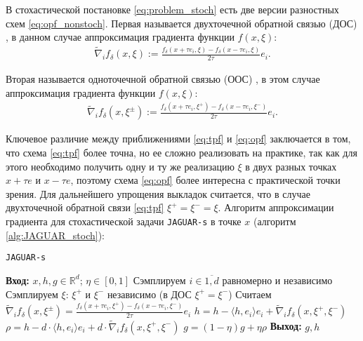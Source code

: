     В стохастической постановке \eqref{eq:problem_stoch} есть две версии разностных схем \eqref{eq:opf_nonstoch}. Первая называется двухточечной обратной связью (ДОС) \cite{duchi2015optimal, shamir2017optimal, doi:10.1137/19M1259225, beznosikov2020gradient, gasnikov2022power}, в данном случае аппроксимация градиента функции $f(x, \xi)$:
    \begin{align} \label{eq:tpf}
        \widetilde{\nabla}_i f_\delta (x, \xi) :=  \frac{f_\delta (x + \tau e_i, \xi) - f_\delta (x - \tau e_i, \xi)}{2 \tau} e_i.
    \end{align}

    Вторая называется одноточечной обратной связью (ООС) \cite{nemirovskij1983problem, flaxman2004online, gasnikov2017stochastic, akhavan2020exploiting, beznosikov2021one}, в этом случае аппроксимация градиента функции $f(x, \xi)$: 
    \begin{align} \label{eq:opf}
        \widetilde{\nabla}_i f_\delta (x, \xi^{\pm}) :=  \frac{f_\delta (x + \tau e_i, \xi^+) - f_\delta (x - \tau e_i, \xi^-)}{2 \tau} e_i.
    \end{align}
    
    Ключевое различие между приближениями \eqref{eq:tpf} и \eqref{eq:opf} заключается в том, что схема \eqref{eq:tpf} более точна, но ее сложно реализовать на практике, так как для этого необходимо получить одну и ту же реализацию $\xi$ в двух разных точках $x + \tau e$ и $x - \tau e$, поэтому схема \eqref{eq:opf} более интересна с практической точки зрения. Для дальнейшего упрощения выкладок считается, что в случае двухточечной обратной связи \eqref{eq:tpf} $\xi^+ = \xi^- = \xi$. Алгоритм аппроксимации градиента для стохастической задачи \texttt{JAGUAR-s} в точке $x$ (алгоритм \ref{alg:JAGUAR_stoch}):

    \begin{algorithm}[H]
        \caption{\texttt{JAGUAR-s}} \label{alg:JAGUAR_stoch}
        \begin{algorithmic}[1]
            \State \textbf{Вход:} $x, h, g \in \mathbb{R}^d$; $\eta \in [0, 1]$
            \State Сэмплируем $i \in \overline{1, d}$ равномерно и независимо
            \State Сэмплируем $\xi$: $\xi^+$ и $\xi^-$ независимо (в ДОС $\xi^+ = \xi^-$)
            \State Считаем $\widetilde{\nabla}_i f_\delta (x, \xi^\pm) = \frac{f_\delta (x + \tau e_i, \xi^+) - f_\delta (x - \tau e_i, \xi^-)}{2 \tau} e_i$
            \State $h = h - \langle h, e_i \rangle e_i + \widetilde{\nabla}_i f_\delta (x, \xi^+, \xi^-)$
            \State $\rho = h - d \cdot \langle h, e_i \rangle e_i + d \cdot \widetilde{\nabla}_i f_\delta (x, \xi^+, \xi^-)$
            \State $g = (1 - \eta) g + \eta \rho$ 
            \State \textbf{Выход:} $g, h$
        \end{algorithmic}
    \end{algorithm}

